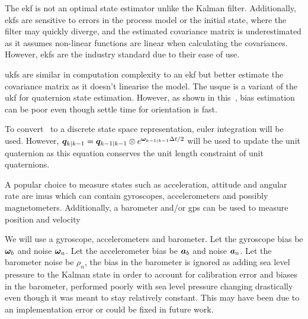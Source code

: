 The \gls{ekf} is not an optimal state estimator unlike the Kalman filter.
Additionally, \glspl{ekf} are sensitive to errors in the process model or the initial state, where the filter may quickly diverge, and the estimated covariance matrix is underestimated as it assumes non-linear functions are linear when calculating the covariances.
However, \glspl{ekf} are the industry standard due to their ease of use.

\Glspl{ukf} are similar in computation complexity to an \gls{ekf} but better estimate the covariance matrix as it doesn't linearise the model. 
The \gls{usque} is a variant of the \gls{ukf} for quaternion state estimation.
However, as shown in this~\cite{Zam2015}, bias estimation can be poor even though settle time for orientation is fast. 

To convert~ to a discrete state space representation, euler integration will be used. However, $\bm q_{k \mid k-1} = \bm q_{k-1 \mid k - 1} \otimes e^{\bm \omega_{k-1  \mid  k - 1} \Delta t/ 2}$ will be used to update the unit quaternion as this equation conserves the unit length constraint of unit quaternions.

A popular choice to measure states such as acceleration, \gls{attitude} and angular rate are \glspl{imu} which can contain gyroscopes, accelerometers and possibly magnetometers. 
Additionally, a barometer and/or gps can be used to measure position and velocity

We will use a gyroscope, accelerometers and barometer. Let the gyroscope bias be $\bm \omega_b$ and noise $\bm \omega_n$. Let the accelerometer bias be $\bm a_b$ and noise $\bm a_n$. Let the barometer noise be $\rho_n$, the bias in the barometer is ignored as adding sea level pressure to the Kalman state in order to account for calibration error and biases in the barometer, performed poorly with sea level pressure changing drastically even though it was meant to stay relatively constant.
This may have been due to an implementation error or could be fixed in future work.

